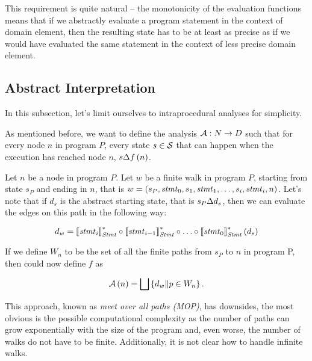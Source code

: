 \documentclass[..thesis.tex]{subfiles}
\begin{document}
This requirement is quite natural -- the monotonicity of the evaluation functions means that if we abstractly evaluate a program statement in the context of domain element,
then the resulting state has to be at least as precise as if we would have evaluated the same statement in the context of less precise domain element.  


\subsection{Abstract Interpretation}

In this subsection, let's limit ourselves to intraprocedural analyses for simplicity.
 
As mentioned before, we want to define the analysis $\mathcal{A} : N \to D$ such that for every node $n$ in program $P$,
every state $s \in \mathcal{S}$ that can happen when the execution has reached node $n$, $s \Delta f \left( n \right)$.
  
Let $n$ be a node in program $P$. Let $w$ be a finite walk in program $P$,
starting from state $s_P$ and ending in $n$, that is $w = \left( s_P, \mathit{stmt}_0, s_1, \mathit{stmt}_1, \ldots, s_i, \mathit{stmt}_i, n \right)$.
Let's note that if $d_s$ is the abstract starting state, that is $s_P \Delta d_s$, then we can evaluate the edges on this path in the following way:

\begin{equation*}
d_w = \left\llbracket \mathit{stmt}_i \right\rrbracket_{\mathit{Stmt}}^{*} \circ \left\llbracket \mathit{stmt}_{i-1} \right\rrbracket_{\mathit{Stmt}}^{*} \circ \ldots \circ  \left\llbracket \mathit{stmt}_0 \right\rrbracket_{\mathit{Stmt}}^{*} \left( d_s \right)  
\end{equation*}
  
If we define $W_n$ to be the set of all the finite paths from $s_P$ to $n$ in program P, then could now define $f$ as

\begin{equation*}
\mathcal{A} \left( n \right) = \bigsqcup \left\lbrace d_w \| p \in W_n \right\rbrace \text{.} 
\end{equation*}  

This approach, known as \textit{meet over all paths (MOP)}, has downsides,
the most obvious is the possible computational complexity as the number of paths can grow exponentially with the size of the program and, even worse,
the number of walks do not have to be finite. Additionally, it is not clear how to handle infinite walks. 
\end{document}

